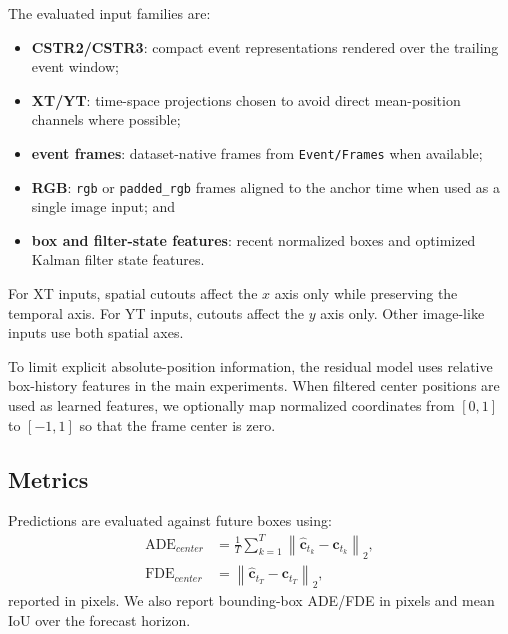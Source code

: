 The evaluated input families are:
\begin{itemize}
  \item \textbf{CSTR2/CSTR3}: compact event representations rendered over the trailing event window;
  \item \textbf{XT/YT}: time-space projections chosen to avoid direct mean-position channels where possible;
  \item \textbf{event frames}: dataset-native frames from \texttt{Event/Frames} when available;
  \item \textbf{RGB}: \texttt{rgb} or \texttt{padded\_rgb} frames aligned to the anchor time when used as a single image input; and
  \item \textbf{box and filter-state features}: recent normalized boxes and optimized Kalman filter state features.
\end{itemize}

For XT inputs, spatial cutouts affect the $x$ axis only while preserving the temporal axis. For YT inputs, cutouts affect the $y$ axis only. Other image-like inputs use both spatial axes.

To limit explicit absolute-position information, the residual model uses relative box-history features in the main experiments. When filtered center positions are used as learned features, we optionally map normalized coordinates from $[0,1]$ to $[-1,1]$ so that the frame center is zero.

\subsection{Metrics}

Predictions are evaluated against future boxes using:
\begin{align}
  \mathrm{ADE}_{center} &= \frac{1}{T}\sum_{k=1}^{T}
  \left\|\hat{\mathbf{c}}_{t_k} - \mathbf{c}_{t_k}\right\|_2, \\
  \mathrm{FDE}_{center} &= 
  \left\|\hat{\mathbf{c}}_{t_T} - \mathbf{c}_{t_T}\right\|_2,
\end{align}
reported in pixels. We also report bounding-box ADE/FDE in pixels and mean IoU over the forecast horizon.

